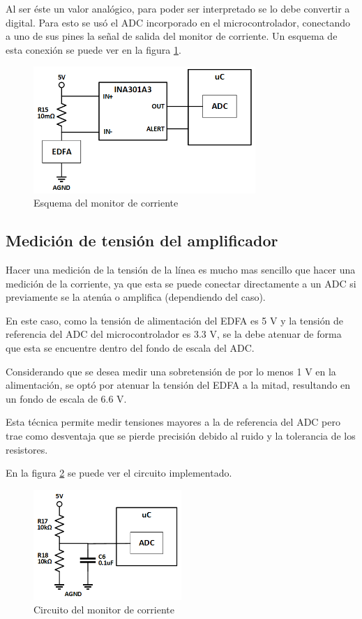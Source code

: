 Al ser éste un valor analógico, para poder ser interpretado se lo debe convertir a digital. Para esto se usó el ADC incorporado en el microcontrolador, conectando a uno de sus pines la señal de salida del monitor de corriente. Un esquema de esta conexión se puede ver en la figura \ref{fig:funcMonitor}.

\begin{figure}[H]
\centering
\includegraphics[width=0.75\textwidth]{./Figures/func_monitor.png}
\caption{Esquema del monitor de corriente}
\label{fig:funcMonitor}
\end{figure}



\subsection{Medición de tensión del amplificador}

Hacer una medición de la tensión de la línea es mucho mas sencillo que hacer una medición de la corriente, ya que esta se puede conectar directamente a un ADC si previamente se la atenúa o amplifica (dependiendo del caso).

En este caso, como la tensión de alimentación del EDFA es 5 V y la tensión de referencia del ADC del microcontrolador es 3.3 V, se la debe atenuar de forma que esta se encuentre dentro del fondo de escala del ADC.

Considerando que se desea medir una sobretensión de por lo menos 1 V en la alimentación, se optó por atenuar la tensión del EDFA a la mitad, resultando en un fondo de escala de 6.6 V.

Esta técnica permite medir tensiones mayores a la de referencia del ADC pero trae como desventaja que se pierde precisión debido al ruido y la tolerancia de los resistores.

En la figura \ref{fig:monTension} se puede ver el circuito implementado.

\begin{figure}[H]
\centering
\includegraphics[width=0.5\textwidth]{./Figures/mon_tension.png}
\caption{Circuito del monitor de corriente}
\label{fig:monTension}
\end{figure}


